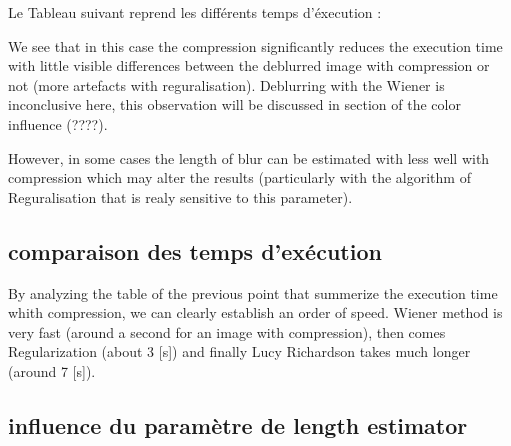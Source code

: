 
Le Tableau suivant reprend les différents temps d'éxecution : 



We see that in this case the compression significantly reduces the execution time with little visible differences between the deblurred image with compression or not (more artefacts with reguralisation). Deblurring with the Wiener is inconclusive here, this observation will be discussed in section of the color influence (????).

However, in some cases the length of blur can be estimated with less well with compression which may alter the results (particularly with the algorithm of Reguralisation that is realy sensitive to this parameter).

\subsection{comparaison des temps d'exécution}

By analyzing the table of the previous point that summerize the execution time whith compression, we can clearly establish an order of speed. Wiener method is very fast (around a second for an image with compression), then comes Regularization (about 3 [s]) and finally Lucy Richardson takes much longer (around 7 [s]).



\subsection{influence du paramètre de length estimator}


